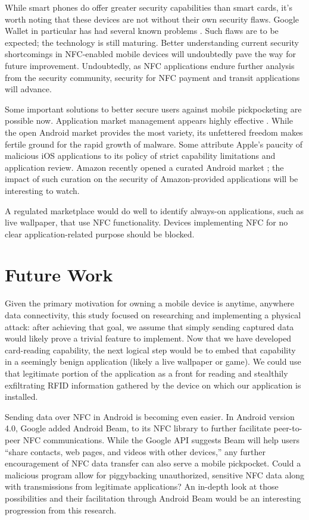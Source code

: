 \documentclass{sig-alternate}
\begin{document}
While smart phones do offer greater security capabilities than smart cards, it's worth noting that these devices are not without their own security flaws.  Google Wallet in particular has had several known problems \cite{google-wallet-pin-cracked} \cite{smartphonechamp-second-major-flaw-google-wallet}.  Such flaws are to be expected; the technology is still maturing.  Better understanding current security shortcomings in NFC-enabled mobile devices will undoubtedly pave the way for future improvement.  Undoubtedly, as NFC applications endure further analysis from the security community, security for NFC payment and transit applications will advance.  

Some important solutions to better secure users against mobile pickpocketing are possible now.  Application market management appears highly effective \cite{electronista-mcafee-malware-surge}.  While the open Android market provides the most variety, its unfettered freedom makes fertile ground for the rapid growth of malware.  Some attribute Apple's paucity of malicious iOS applications to its policy of strict capability limitations and application review.  Amazon recently opened a curated Android market \cite{amazon-android-appstore}; the impact of such curation on the security of Amazon-provided applications will be interesting to watch.  

A regulated marketplace would do well to identify always-on applications, such as live wallpaper, that use NFC functionality.  Devices implementing NFC for no clear application-related purpose should be blocked.

\section{Future Work}
Given the primary motivation for owning a mobile device is anytime, anywhere data connectivity, this study focused on researching and implementing a physical attack:  after achieving that goal, we assume that simply sending captured data would likely prove a trivial feature to implement.  Now that we have developed card-reading capability, the next logical step would be to embed that capability in a seemingly benign application (likely a live wallpaper or game).  We could use that legitimate portion of the application as a front for reading and stealthily exfiltrating RFID information gathered by the device on which our application is installed.  

Sending data over NFC in Android is becoming even easier.  In Android version 4.0, Google added Android Beam, \cite{ieee-beacon-mobileos-review} to its NFC library to further facilitate peer-to-peer NFC communications.  While the Google API suggests Beam will help users ``share contacts, web pages, and videos with other devices,'' \cite{android-developers-beam} any further encouragement of NFC data transfer can also serve a mobile pickpocket.  Could a malicious program allow for piggybacking unauthorized, sensitive NFC data along with transmissions from legitimate applications?  An in-depth look at those possibilities and their facilitation through Android Beam would be an interesting progression from this research.       
\end{document}
